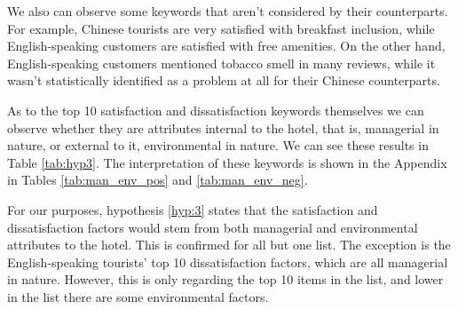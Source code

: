 We also can observe some keywords that aren't considered by their counterparts. For example, Chinese tourists are very satisfied with breakfast inclusion, while English-speaking customers are satisfied with free amenities. On the other hand, English-speaking customers mentioned tobacco smell in many reviews, while it wasn't statistically identified as a problem at all for their Chinese counterparts.

As to the top 10 satisfaction and dissatisfaction keywords themselves we can observe whether they are attributes internal to the hotel, that is, managerial in nature, or external to it, environmental in nature. We can see these results in Table \ref{tab:hyp3}. The interpretation of these keywords is shown in the Appendix in Tables \ref{tab:man_env_pos} and \ref{tab:man_env_neg}.

\DIFdelbegin %
\DIFdelendFL \DIFaddbeginFL \begin{table}[hbp]
\DIFaddendFL \caption{Managerial and Environmental nature of the most frequently used keywords}
\label{tab:hyp3}
\end{table}

For our purposes, hypothesis \ref{hyp:3} states that the satisfaction and dissatisfaction factors would stem from both managerial and environmental attributes to the hotel. This is confirmed for all but one list. The exception is the English-speaking tourists' top 10 dissatisfaction factors, which are all managerial in nature. However, this is only regarding the top 10 items in the list, and lower in the list there are some environmental factors.

